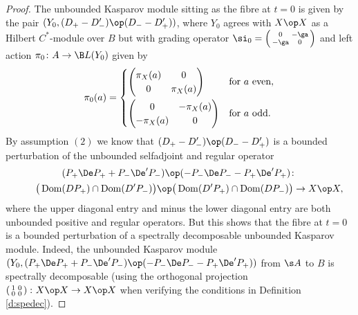 \begin{proof}
The unbounded Kasparov module sitting as the fibre at $t = 0$ is given by the pair $( Y_0, (D_+ - D_-') \op (D_- - D_+') )$, where $Y_0$ agrees with $X \op X$ as a Hilbert $C^*$-module over $B$ but with grading operator $\si_0 = \left(\begin{smallmatrix} 0 & - \ga \\ - \ga & 0\end{smallmatrix}\right)$ and left action $\pi_0\colon A \to \B L(Y_0)$ given by
\[
\pi_0(a) = \begin{cases} \left(\begin{matrix} \pi_X(a) & 0 \\ 0 & \pi_X(a)\end{matrix}\right) & \text{for} \ a \text{ even}, \vspace{1mm}\\ \left(\begin{matrix} 0 & -\pi_X(a) \\ -\pi_X(a) & 0\end{matrix}\right) & \text{for} \ a \text{ odd} .\end{cases}
\]
By assumption $(2)$ we know that $(D_+ - D_-') \op (D_- - D_+')$ is a bounded perturbation of the unbounded selfadjoint and regular operator
\begin{gather*}
 ( P_+ \De P_+ + P_- \De' P_- ) \op ( - P_- \De P_- - P_+ \De' P_+)\colon \\
\qquad {}\big( \operatorname{Dom}( DP_+) \cap \operatorname{Dom}( D' P_-) \big) \op \big( \operatorname{Dom}( D'P_+) \cap \operatorname{Dom}( D P_-) \big) \to X \op X ,
\end{gather*}
where the upper diagonal entry and minus the lower diagonal entry are both unbounded positive and regular operators. But this shows that the fibre at $t = 0$ is a bounded perturbation of a spectrally decomposable unbounded Kasparov module. Indeed, the unbounded Kasparov module $( Y_0, ( P_+ \De P_+ + P_- \De' P_- ) \op ( - P_- \De P_- - P_+ \De' P_+) )$ from $\s A$ to $B$ is spectrally decomposable (using the orthogonal projection $\left(\begin{smallmatrix} 1 & 0 \\ 0 & 0\end{smallmatrix}\right)\colon X \op X \to X \op X$ when verifying the conditions in Definition \ref{d:spedec}).
\end{proof}

